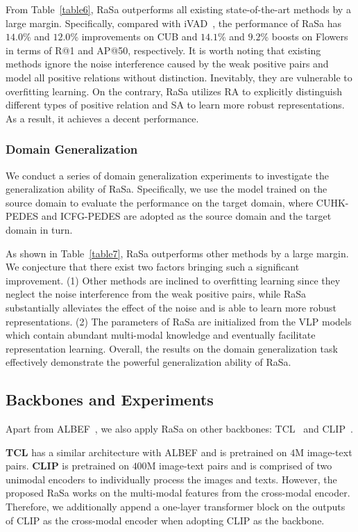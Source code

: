 \documentclass{article}
\begin{document}
From Table~\ref{table6}, RaSa outperforms all existing state-of-the-art methods by a large margin.
Specifically, compared with iVAD~\cite{wang2022improving}, the performance of RaSa has $14.0$\% and $12.0$\% improvements on CUB and $14.1$\% and $9.2$\% boosts on Flowers in terms of R@1 and AP@50, respectively.
It is worth noting that existing methods ignore the noise interference caused by the weak positive pairs and model all positive relations without distinction.
Inevitably, they are vulnerable to overfitting learning.
On the contrary, RaSa utilizes RA to explicitly distinguish different types of positive relation and SA to learn more robust representations.
As a result, it achieves a decent performance.


\subsubsection{Domain Generalization}
We conduct a series of domain generalization experiments to investigate the generalization ability of RaSa.
Specifically, we use the model trained on the source domain to evaluate the performance on the target domain, where CUHK-PEDES and ICFG-PEDES are adopted as the source domain and the target domain in turn.

As shown in Table~\ref{table7}, RaSa outperforms other methods by a large margin. 
We conjecture that there exist two factors bringing such a significant improvement.
(1) Other methods are inclined to overfitting learning since they neglect the noise interference from the weak positive pairs, while RaSa substantially alleviates the effect of the noise and is able to learn more robust representations.
(2) The parameters of RaSa are initialized from the VLP models which contain abundant multi-modal knowledge and eventually facilitate representation learning.
Overall, the results on the domain generalization task effectively demonstrate the powerful generalization ability of RaSa.



\subsection{Backbones and Experiments}
\label{backbones}
Apart from ALBEF~\cite{NEURIPS2021_50525975}, we also apply RaSa on other backbones: TCL~\cite{yang2022vision} and CLIP~\cite{radford2021learning}.

\textbf{TCL} has a similar architecture with ALBEF and is pretrained on $4$M image-text pairs.
\textbf{CLIP} is pretrained on $400$M image-text pairs and is comprised of two unimodal encoders to individually process the images and texts.
However, the proposed RaSa works on the multi-modal features from the cross-modal encoder.
Therefore, we additionally append a one-layer transformer block on the outputs of CLIP as the cross-modal encoder when adopting CLIP as the backbone. 
\end{document}

